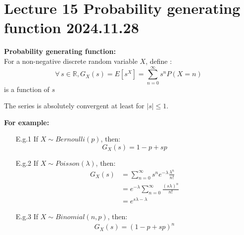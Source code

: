 \documentclass{article}
\begin{document}
\section{Lecture 15 Probability generating function 2024.11.28}
\begin{definition}
    \textbf{Probability generating function:}\\
    For a non-negative discrete random variable $X$, define :
    \begin{equation*}
        \forall \, s \in \mathbb{R}, G_X(s) = E[s^X] = \sum^\infty_{n=0}s^nP(X=n)
    \end{equation*}
    is a function of $s$
\end{definition}
The series is absolutely convergent at least for $|s| \leq 1$.

\textbf{For example:}
\begin{enumerate}
    \item[E.g.1] If $X \sim Bernoulli(p)$, then:
    \begin{equation*}
        G_X(s) = 1 - p + sp
    \end{equation*}
    \item[E.g.2] If $X \sim Poisson(\lambda)$, then:
    \begin{align*}
        G_X(s)  &= \sum^\infty_{n=0}s^ne^{-\lambda}\frac{\lambda^n}{n!} \\
                &= e^{-\lambda}\sum^\infty_{n=0}\frac{(s\lambda)^n}{n!} \\
                &= e^{s\lambda - \lambda}
    \end{align*}
    \item[E.g.3] If $X \sim Binomial(n,p)$, then:
    \begin{align*}
        G_X(s) = (1 - p + sp)^n
    \end{align*}
\end{enumerate}
\end{document}
